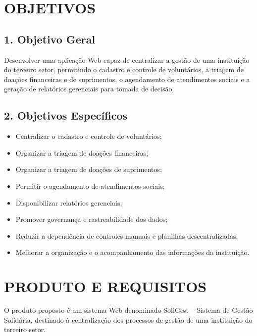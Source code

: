 \documentclass[12pt,a4paper]{article}
\begin{document}

\section*{OBJETIVOS}

\subsection*{1. Objetivo Geral}

Desenvolver uma aplicação Web capaz de centralizar a gestão de uma
instituição do terceiro setor, permitindo o cadastro e controle de
voluntários, a triagem de doações financeiras e de suprimentos, o
agendamento de atendimentos sociais e a geração de relatórios gerenciais
para tomada de decisão.

\subsection*{2. Objetivos Específicos}

\begin{itemize}
    \item Centralizar o cadastro e controle de voluntários;
    \item Organizar a triagem de doações financeiras;
    \item Organizar a triagem de doações de suprimentos;
    \item Permitir o agendamento de atendimentos sociais;
    \item Disponibilizar relatórios gerenciais;
    \item Promover governança e rastreabilidade dos dados;
    \item Reduzir a dependência de controles manuais e planilhas
    descentralizadas;
    \item Melhorar a organização e o acompanhamento das informações da
    instituição.
\end{itemize}


\section*{PRODUTO E REQUISITOS}

O produto proposto é um sistema Web denominado SoliGest -- Sistema de
Gestão Solidária, destinado à centralização dos processos de gestão de
uma instituição do terceiro setor.
\end{document}
